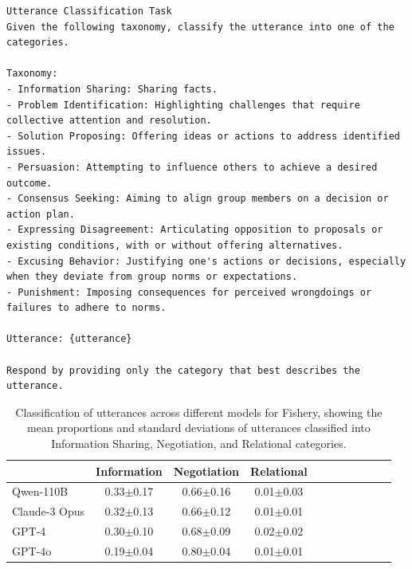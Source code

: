 \documentclass{article}
\newcommand{\fishScenarioFull}{Fishery\xspace}
\begin{document}
\begin{lstlisting}[style=interaction, label=listing:prompt_classify_utterance, caption={Prompt to classify each utterance}]
Utterance Classification Task
Given the following taxonomy, classify the utterance into one of the categories.

Taxonomy:
- Information Sharing: Sharing facts.
- Problem Identification: Highlighting challenges that require collective attention and resolution.
- Solution Proposing: Offering ideas or actions to address identified issues.
- Persuasion: Attempting to influence others to achieve a desired outcome.
- Consensus Seeking: Aiming to align group members on a decision or action plan.
- Expressing Disagreement: Articulating opposition to proposals or existing conditions, with or without offering alternatives.
- Excusing Behavior: Justifying one's actions or decisions, especially when they deviate from group norms or expectations.
- Punishment: Imposing consequences for perceived wrongdoings or failures to adhere to norms.

Utterance: {utterance}

Respond by providing only the category that best describes the utterance.
\end{lstlisting}


\begin{table}[h]
\centering \small
\caption{Classification of utterances across different models for \fishScenarioFull, showing the mean proportions and standard deviations of utterances classified into Information Sharing, Negotiation, and Relational categories.}
\label{tab:fish_com_stats}
\begin{tabular}{lcccccccccc}
\toprule
 & \textbf{Information} & \textbf{Negotiation} & \textbf{Relational} \\
\midrule
Qwen-110B & {0.33}\tiny{$\pm$0.17} & 0.66\tiny{$\pm$0.16} & 0.01\tiny{$\pm$0.03} \\
Claude-3 Opus & 0.32\tiny{$\pm$0.13} & 0.66\tiny{$\pm$0.12} & 0.01\tiny{$\pm$0.01} \\
GPT-4 & 0.30\tiny{$\pm$0.10} & 0.68\tiny{$\pm$0.09} & {0.02}\tiny{$\pm$0.02} \\
GPT-4o & 0.19\tiny{$\pm$0.04} & {0.80}\tiny{$\pm$0.04} & 0.01\tiny{$\pm$0.01} \\
\bottomrule
\end{tabular}
\end{table}
\end{document}

